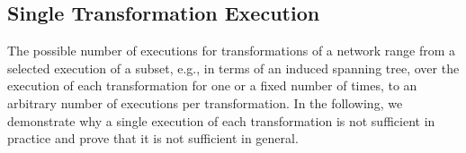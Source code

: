 


\subsection{Single Transformation Execution}

The possible number of executions for transformations of a network range from a selected execution of a subset, e.g., in terms of an induced spanning tree, over the execution of each transformation for one or a fixed number of times, to an arbitrary number of executions per transformation.
In the following, we demonstrate why a single execution of each transformation is not sufficient in practice and prove that it is not sufficient in general.

